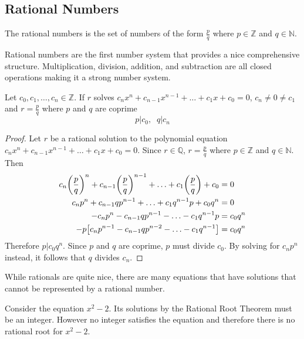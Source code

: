 \documentclass[../notes.tex]{subfiles}
\begin{document}

\subsection{Rational Numbers}

\begin{definition}
	The rational numbers is the set of numbers of the form $\frac{p}{q}$ where $p \in \mathbb{Z}$ and $q \in \mathbb{N}$.
\end{definition}

Rational numbers are the first number system that provides a nice comprehensive structure. Multiplication, division, addition, and subtraction are all closed operations making it a strong number system.

\begin{theorem}
	Let $c_0, c_1, \ldots, c_{n} \in \mathbb{Z}$. If $r$ solves $c_{n} x^n + c_{n-1} x^{n-1} + \ldots + c_1 x + c_0 = 0$, $c_{n} \neq 0 \neq c_1$ and $r = \frac{p}{q}$ where $p$ and $q$ are coprime
	\[
		p \vert c_0, \;\; q \vert c_{n}
	\]
\end{theorem}
\begin{proof}
	Let $r$ be a rational solution to the polynomial equation $c_{n} x^n + c_{n-1} x^{n-1} + \ldots + c_1 x + c_0 = 0$. Since $r \in \mathbb{Q}$, $r = \frac{p}{q}$ where $p \in \mathbb{Z}$ and $q \in \mathbb{N}$. Then
	\begin{align*}
		c_{n} \qty(\frac{p}{q})^n + c_{n-1} \qty(\frac{p}{q})^{n-1} + \ldots + c_1 \qty(\frac{p}{q}) + c_0 &= 0 \\
		c_{n} p^n + c_{n-1} qp^{n-1} + \ldots + c_1 q^{n-1}p + c_0 q^n &= 0 \\
		-c_{n} p^n - c_{n-1} qp^{n-1} - \ldots - c_1 q^{n-1}p &= c_0 q^n \\
		-p \qty[c_{n} p^{n-1} - c_{n-1} qp^{n-2} - \ldots - c_1 q^{n-1}] &= c_0 q^n
	\end{align*}
	Therefore $p \vert c_0 q^n$. Since $p$ and $q$ are coprime, $p$ must divide $c_0$. By solving for $c_{n} p^n$ instead, it follows that $q$ divides $c_{n}$.
\end{proof}

While rationals are quite nice, there are many equations that have solutions that cannot be represented by a rational number.

\begin{example}[$\sqrt{2}$]
	Consider the equation $x^2 - 2$. Its solutions by the Rational Root Theorem must be an integer. However no integer satisfies the equation and therefore there is no rational root for $x^2-2$.
\end{example}
\end{document}
